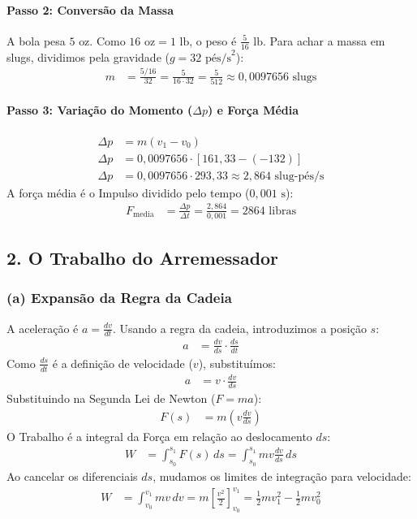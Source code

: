 \documentclass[12pt,a4paper]{article}
\begin{document}
\paragraph{Passo 2: Conversão da Massa}
A bola pesa $5\text{ oz}$. Como $16\text{ oz} = 1\text{ lb}$, o peso é $\frac{5}{16}\text{ lb}$. Para achar a massa em slugs, dividimos pela gravidade ($g = 32\text{ pés/s}^2$):
\begin{align*}
    m &= \frac{5/16}{32} = \frac{5}{16 \cdot 32} = \frac{5}{512} \approx 0{,}0097656\text{ slugs}
\end{align*}

\paragraph{Passo 3: Variação do Momento ($\Delta p$) e Força Média}
\begin{align*}
    \Delta p &= m(v_1 - v_0) \\
    \Delta p &= 0{,}0097656 \cdot [161{,}33 - (-132)] \\
    \Delta p &= 0{,}0097656 \cdot 293{,}33 \approx 2{,}864\text{ slug-pés/s}
\end{align*}
A força média é o Impulso dividido pelo tempo ($0{,}001\text{ s}$):
\begin{align*}
    F_{\text{media}} &= \frac{\Delta p}{\Delta t} = \frac{2{,}864}{0{,}001} = 2864\text{ libras}
\end{align*}

\subsection{2. O Trabalho do Arremessador}

\subsubsection*{(a) Expansão da Regra da Cadeia}
A aceleração é $a = \frac{dv}{dt}$. Usando a regra da cadeia, introduzimos a posição $s$:
\begin{align*}
    a &= \frac{dv}{ds} \cdot \frac{ds}{dt}
\end{align*}
Como $\frac{ds}{dt}$ é a definição de velocidade ($v$), substituímos:
\begin{align*}
    a &= v \cdot \frac{dv}{ds}
\end{align*}
Substituindo na Segunda Lei de Newton ($F = ma$):
\begin{align*}
    F(s) &= m \left(v \frac{dv}{ds}\right)
\end{align*}
O Trabalho é a integral da Força em relação ao deslocamento $ds$:
\begin{align*}
    W &= \int_{s_0}^{s_1} F(s) \, ds = \int_{s_0}^{s_1} m v \frac{dv}{ds} \, ds
\end{align*}
Ao cancelar os diferenciais $ds$, mudamos os limites de integração para velocidade:
\begin{align*}
    W &= \int_{v_0}^{v_1} mv \, dv = m \left[ \frac{v^2}{2} \right]_{v_0}^{v_1} = \frac{1}{2}mv_1^2 - \frac{1}{2}mv_0^2
\end{align*}
\end{document}
